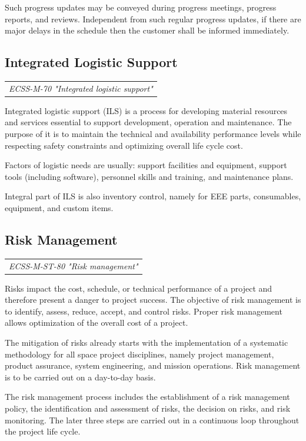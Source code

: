 Such progress updates may be conveyed during progress meetings, progress reports, and reviews. Independent from such regular progress updates, if there are major delays in the schedule then the customer shall be informed immediately.

\subsection{Integrated Logistic Support}

\begin{tabular}{l}
\textit{ECSS-M-70 "Integrated logistic support" \cite{ECSS-M-70}}
\end{tabular}

Integrated logistic support (ILS) is a process for developing material resources and services essential to support development, operation and maintenance. The purpose of it is to maintain the technical and availability performance levels while respecting safety constraints and optimizing overall life cycle cost.

Factors of logistic needs are usually: support facilities and equipment, support tools (including software), personnel skills and training, and maintenance plans.  

Integral part of ILS is also inventory control, namely for EEE parts, consumables, equipment, and custom items.

\subsection{Risk Management}
\label{sec:Risk Management}

\begin{tabular}{l}
\textit{ECSS-M-ST-80 "Risk management" \cite{ECSS-M-ST-80}}
\end{tabular}

Risks impact the cost, schedule, or technical performance of a project and therefore present a danger to project success. The objective of risk management is to identify, assess, reduce, accept, and control risks. Proper risk management allows optimization of the overall cost of a project.

The mitigation of risks already starts with the implementation of a systematic methodology for all space project disciplines, namely project management, product assurance, system engineering, and mission operations. Risk management is to be carried out on a day-to-day basis.

The risk management process includes the establishment of a risk management policy, the identification and assessment of risks, the decision on risks, and risk monitoring. The later three steps are carried out in a continuous loop throughout the project life cycle.

